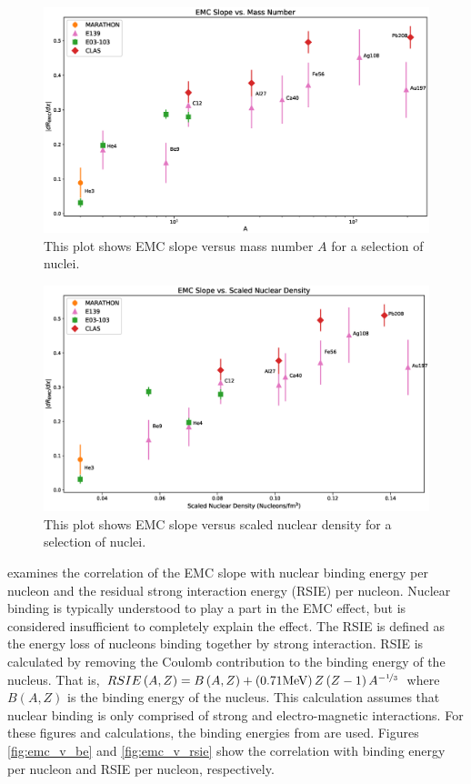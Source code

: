 \begin{figure}[p]
	\includegraphics[width=\textwidth]{./results/fig/EMC_vs_A.eps}
	\caption{This plot shows EMC slope versus mass number $A$ for a selection of nuclei.}
	\label{fig:emc_v_A}
\end{figure}

\begin{figure}[p]
	\includegraphics[width=\textwidth]{./results/fig/EMC_vs_SND.eps}
	\caption{This plot shows EMC slope versus scaled nuclear density for a selection of nuclei.}
	\label{fig:emc_v_snd}
\end{figure}

\cite{slope_predict} examines the correlation of the EMC slope with nuclear binding energy per nucleon and the residual strong interaction energy (RSIE) per nucleon. Nuclear binding is typically understood to play a part in the EMC effect, but is considered insufficient to completely explain the effect. The RSIE is defined as the energy loss of nucleons binding together by strong interaction. RSIE is calculated by removing the Coulomb contribution to the binding energy of the nucleus. That is, $RSIE\left(A,Z\right) = B\left(A,Z\right) + \left(0.71 \text{MeV}\right)Z\left(Z-1\right)A^{-\nicefrac{1}{3}}$ where $B\left(A,Z\right)$ is the binding energy of the nucleus. This calculation assumes that nuclear binding is only comprised of strong and electro-magnetic interactions. For these figures and calculations, the binding energies from \cite{BindingEnergy} are used. Figures \ref{fig:emc_v_be} and \ref{fig:emc_v_rsie} show the correlation with binding energy per nucleon and RSIE per nucleon, respectively.

